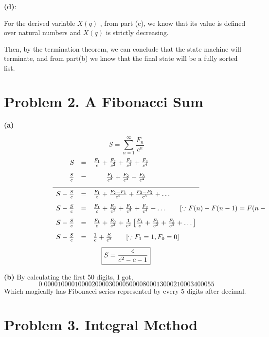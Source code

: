 \documentclass{article}
\begin{document}
\vspace{\baselineskip}
\noindent\textbf{(d)}:

For the derived variable $X(q)$ , from part (c), we know that its value is defined over natural numbers and $X(q)$ is strictly decreasing.

Then, by the  termination theorem, we can conclude that the  state machine will terminate, and
from part(b) we know that the  final state will be a fully sorted list.



\section*{Problem 2. A Fibonacci Sum}

\textbf{(a)}

\[ S = \sum_{n = 1}^{\infty} \frac{F_n}{c^n}\]
\begin{equation*}
\begin{array}{r c l}
  S &=& \frac{F_1}{c} + \frac{F_2}{c^2} + \frac{F_3}{c^3} + \frac{F_4}{c^4} \\[2ex]
  \frac{S}{c} &=& \phantom{\frac{F_1}{c} +} \frac{F_1}{c^2} + \frac{F_2}{c^3} + \frac{F_3}{c^4} \\[2ex]
\hline \\[-2ex] 
  S - \frac{S}{c} &=& \frac{F_1}{c} + \frac{F_2 - F_1}{c^2} + \frac{F_3 - F_2}{c^3} + \dots \\[2ex]
  S - \frac{S}{c} &=& \frac{F_1}{c} + \frac{F_0}{c^2} + \frac{F_1}{c^3} + \frac{F_2}{c^4} + \dots \rlap{\qquad $[\because F(n) - F(n-1) = F(n-2)]$} \\[2ex]
  S - \frac{S}{c} &=& \frac{F_1}{c} + \frac{F_0}{c^2} + \frac{1}{c^2} \left[ \frac{F_1}{c} + \frac{F_2}{c^2} + \frac{F_3}{c^3} + \dots \right] \\[2ex]
  S - \frac{S}{c} &=& \frac{1}{c} + \frac{S}{c^2} \rlap{\qquad $[\because F_1 = 1, F_0 = 0]$} \\[2ex]
  \multicolumn{3}{c}{\boxed{S = \frac{c}{c^2 - c - 1}}}
\end{array}
\end{equation*}

\textbf{(b)}
By calculating the first 50 digits, I got,
\[0.00001000010000200003000050000800013000210003400055\]
Which magically has Fibonacci series represented by every 5 digits after decimal.


\section*{Problem 3. Integral Method }
\end{document}
